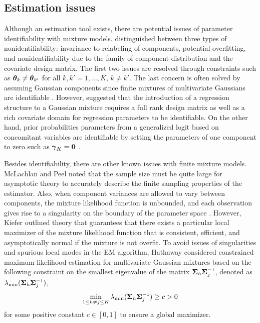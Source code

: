 \subsection{Estimation issues}
Although an estimation tool exists, there are potential issues of parameter identifiability with mixture models. \Textcite{fruhwirth2006} distinguished between three types of nonidentifiability: invariance to  relabeling of components, potential overfitting, and nonidentifiability due to the family of component distribution and the covariate design matrix. The first two issues are resolved through constraints such as $\boldsymbol\theta_{k}\not=\boldsymbol\theta_{k'}$ for all $k,k'=1,...,K$, $k\not=k'$. The last concern is often solved by assuming Gaussian components since finite mixtures of multivariate Gaussians are identifiable \cite{teicher1963,yakowitz1968}. However, \textcite{hennig2000} suggested that the introduction of a regression structure to a Gaussian mixture requires a full rank design matrix as well as a rich covariate domain for regression parameters to be identifiable. On the other hand, prior probabilities parameters from a generalized logit based on concomitant variables are identifiable by setting the parameters of one component to zero such as $\boldsymbol\gamma_{K}=\boldsymbol0$ \cite{jiang1999}.

Besides identifiability, there are other known issues with finite mixture models. McLachlan and Peel \cite{mclachlan2000} noted that the sample size must be quite large for asymptotic theory to accurately describe the finite sampling properties of the estimator. Also, when component variances are allowed to vary between components, the mixture likelihood function is unbounded, and each observation gives rise to a singularity on the boundary of the parameter space \cite{day1969,kiefer1956}. However, Kiefer \cite{kiefer1978} outlined theory that guarantees that there exists a particular local maximizer of the mixture likelihood function that is consistent, efficient, and asymptotically normal if the mixture is not overfit. To avoid issues of singularities and spurious local modes in the EM algorithm, Hathaway \cite{hathaway1985} considered constrained maximum likelihood estimation for multivariate Gaussian mixtures based on the following constraint on the smallest eigenvalue of the matrix $\boldsymbol\Sigma_{h}\boldsymbol\Sigma_{j}^{-1}$, denoted as $\lambda_{\text{min}}(\boldsymbol\Sigma_{h}\boldsymbol\Sigma_{j}^{-1})$,
$$\min_{1\leq h\not=j\leq K}\lambda_{\text{min}}(\boldsymbol\Sigma_{h}\boldsymbol\Sigma_{j}^{-1})\geq c > 0$$ for some positive constant $c\in[0,1]$ to ensure a global maximizer. 



